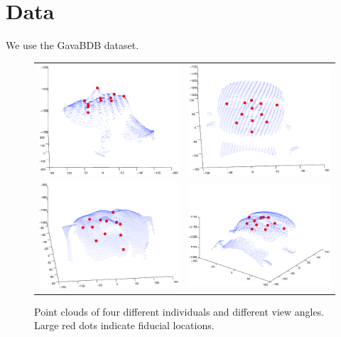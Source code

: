 \documentclass[runningheads]{llncs}
\begin{document}
\section{Data}
We use the GavaBDB\cite{moreno2004gavabdb} dataset.
\begin{figure}[ht]
\begin{tabular}{cc}
\includegraphics[width=.4\linewidth]{resources/figures/face1.png} &
\includegraphics[width=.4\linewidth]{resources/figures/face2.png} \\
\includegraphics[width=.4\linewidth]{resources/figures/face3.png} &
\includegraphics[width=.4\linewidth]{resources/figures/face4.png}
\end{tabular}
\caption{Point clouds of four different individuals and different view angles.  Large red dots indicate fiducial locations.}
\end{figure}
\end{document}
